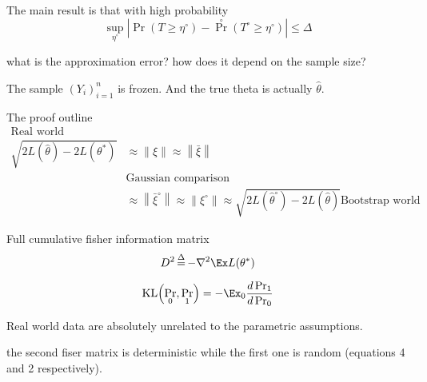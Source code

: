 \documentclass[a4paper]{article}
\newcommand{\brac}[1]{{\left ( #1 \right )}}
\newcommand{\abs}[1]{{\left | #1 \right |}}
\newcommand{\nrm}[1]{{\left\| #1 \right \|}}
\newcommand{\defn}{\mathop{\overset{\Delta}{=}}\nolimits}
\begin{document}
The main result is that with high probability
\[\sup_{\eta^\circ} \abs{ \Pr\brac{T\geq \eta^\circ} -\Pr^\circ\brac{T^\circ\geq \eta^\circ} } \leq \Delta\]

what is the approximation error? how does it depend on the sample size?

The sample $\brac{Y_i}_{i=1}^n$ is frozen. And the true theta is actually $\hat{\theta}$.

The proof outline
\begin{align*}
	\text{Real world}&\\
	\sqrt{2L(\hat{\theta}) - 2L(\theta^*) } &\approx \nrm{\xi} \approx \nrm{\bar{\xi}}\\
	& \text{Gaussian comparison}\\
	&\approx \nrm{\bar{\xi}^\circ} \approx \nrm{\xi^\circ} \approx \sqrt{2L(\hat{\theta}^\circ) - 2L(\hat{\theta}) }
	\text{Bootstrap world}&
\end{align*}

Full cumulative fisher information matrix
\[D^2 \defn -\nabla^2 \Ex L(\theta^*)\]

\[\text{KL}\brac{\Pr_0,\Pr_1} = - \Ex_0 \frac{d\Pr_1}{d\Pr_0}\]

Real world data are absolutely unrelated to the parametric assumptions.

the second fiser matrix is deterministic while the first one is random (equations 4 and 2 respectively).

\end{document}
